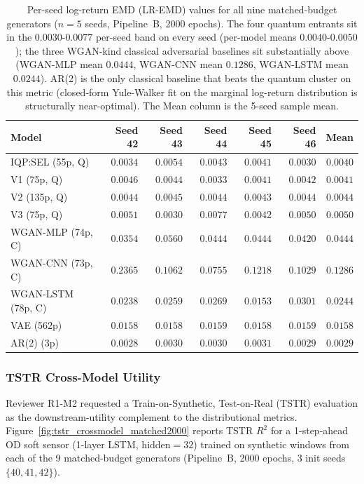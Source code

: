 \begin{table}[!htbp]
\centering
\caption{Per-seed log-return EMD (LR-EMD) values for all nine
matched-budget generators ($n=5$ seeds, Pipeline~B, 2000 epochs).
The four quantum entrants sit in the $0.0030$-$0.0077$ per-seed
band on every seed (per-model means $0.0040$-$0.0050$); the three
WGAN-kind classical adversarial baselines sit substantially above
(WGAN-MLP mean $0.0444$, WGAN-CNN mean $0.1286$, WGAN-LSTM mean
$0.0244$). AR(2) is the only classical baseline that beats the
quantum cluster on this metric (closed-form Yule-Walker fit on the
marginal log-return distribution is structurally near-optimal).
The Mean column is the 5-seed sample mean.}
\label{tbl:per_seed_lr_emd}
\scriptsize
\setlength{\tabcolsep}{6pt}
\begin{tabular}{@{}lrrrrrr@{}}
\toprule
\textbf{Model} & \textbf{Seed 42} & \textbf{Seed 43} & \textbf{Seed 44} & \textbf{Seed 45} & \textbf{Seed 46} & \textbf{Mean} \\
\midrule
IQP:SEL (55p, Q) & $0.0034$ & $0.0054$ & $0.0043$ & $0.0041$ & $0.0030$ & $0.0040$ \\
V1 (75p, Q) & $0.0046$ & $0.0044$ & $0.0033$ & $0.0041$ & $0.0042$ & $0.0041$ \\
V2 (135p, Q) & $0.0044$ & $0.0045$ & $0.0044$ & $0.0043$ & $0.0044$ & $0.0044$ \\
V3 (75p, Q) & $0.0051$ & $0.0030$ & $0.0077$ & $0.0042$ & $0.0050$ & $0.0050$ \\
WGAN-MLP (74p, C) & $0.0354$ & $0.0560$ & $0.0444$ & $0.0444$ & $0.0420$ & $0.0444$ \\
WGAN-CNN (73p, C) & $0.2365$ & $0.1062$ & $0.0755$ & $0.1218$ & $0.1029$ & $0.1286$ \\
WGAN-LSTM (78p, C) & $0.0238$ & $0.0259$ & $0.0269$ & $0.0153$ & $0.0301$ & $0.0244$ \\
VAE (562p) & $0.0158$ & $0.0158$ & $0.0159$ & $0.0158$ & $0.0159$ & $0.0158$ \\
AR(2) (3p) & $0.0028$ & $0.0030$ & $0.0030$ & $0.0031$ & $0.0029$ & $0.0029$ \\
\bottomrule
\end{tabular}
\end{table}

\subsubsection{TSTR Cross-Model Utility}

Reviewer R1-M2 requested a Train-on-Synthetic, Test-on-Real (TSTR)
evaluation as the downstream-utility complement to the distributional
metrics. Figure~\ref{fig:tstr_crossmodel_matched2000} reports TSTR
$R^2$ for a 1-step-ahead OD soft sensor (1-layer LSTM,
hidden$=32$) trained on synthetic windows from each of the 9
matched-budget generators (Pipeline~B, 2000 epochs, 3 init seeds
$\{40, 41, 42\}$).

